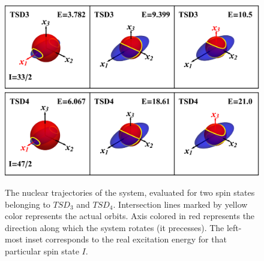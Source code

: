 \documentclass[myclassdoc,debug]{rjparticle}
\begin{document}
\begin{figure}
    \centering
    \includegraphics[scale=0.7]{figs/tsd3_spin1.eps}
    \includegraphics[scale=0.7]{figs/tsd4_spin1.eps}
    \caption{The nuclear trajectories of the system, evaluated for two spin states belonging to $TSD_3$ and $TSD_4$. Intersection lines marked by yellow color represents the actual orbits. Axis colored in red represents the direction along which the system rotates (it precesses). The left-most inset corresponds to the real excitation energy for that particular spin state $I$.}
    \label{trajectories-34}
\end{figure}
\end{document}
